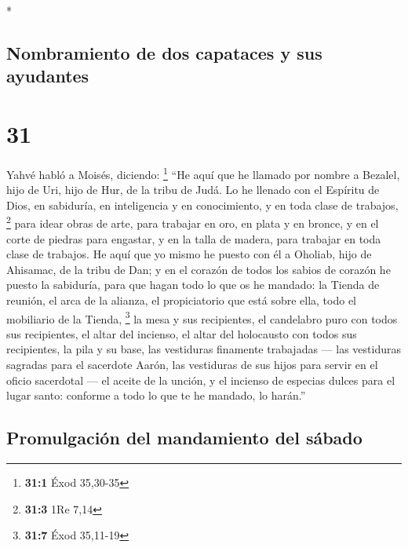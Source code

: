 \begin{paracol}{2}
\begin{otherlanguage}{english}
\end{otherlanguage}

\switchcolumn[0]*

\hypertarget{nombramiento-de-dos-capataces-y-sus-ayudantes}{%
\subsection{Nombramiento de dos capataces y sus
ayudantes}\label{nombramiento-de-dos-capataces-y-sus-ayudantes}}

\hypertarget{section-60}{%
\section{31}\label{section-60}}

 Yahvé habló a Moisés, diciendo: \footnote{\textbf{31:1}
  Éxod 35,30-35}  ``He aquí que he llamado por nombre a
Bezalel, hijo de Uri, hijo de Hur, de la tribu de Judá. 
Lo he llenado con el Espíritu de Dios, en sabiduría, en inteligencia y
en conocimiento, y en toda clase de trabajos, \footnote{\textbf{31:3}
  1Re 7,14}  para idear obras de arte, para trabajar en
oro, en plata y en bronce,  y en el corte de piedras para
engastar, y en la talla de madera, para trabajar en toda clase de
trabajos.  He aquí que yo mismo he puesto con él a
Oholiab, hijo de Ahisamac, de la tribu de Dan; y en el corazón de todos
los sabios de corazón he puesto la sabiduría, para que hagan todo lo que
os he mandado:  la Tienda de reunión, el arca de la
alianza, el propiciatorio que está sobre ella, todo el mobiliario de la
Tienda, \footnote{\textbf{31:7} Éxod 35,11-19}  la mesa y
sus recipientes, el candelabro puro con todos sus recipientes, el altar
del incienso,  el altar del holocausto con todos sus
recipientes, la pila y su base,  las vestiduras finamente
trabajadas --- las vestiduras sagradas para el sacerdote Aarón, las
vestiduras de sus hijos para servir en el oficio sacerdotal ---
 el aceite de la unción, y el incienso de especias dulces
para el lugar santo: conforme a todo lo que te he mandado, lo harán.''

\hypertarget{promulgaciuxf3n-del-mandamiento-del-suxe1bado}{%
\subsection{Promulgación del mandamiento del
sábado}\label{promulgaciuxf3n-del-mandamiento-del-suxe1bado}}


\end{paracol}
